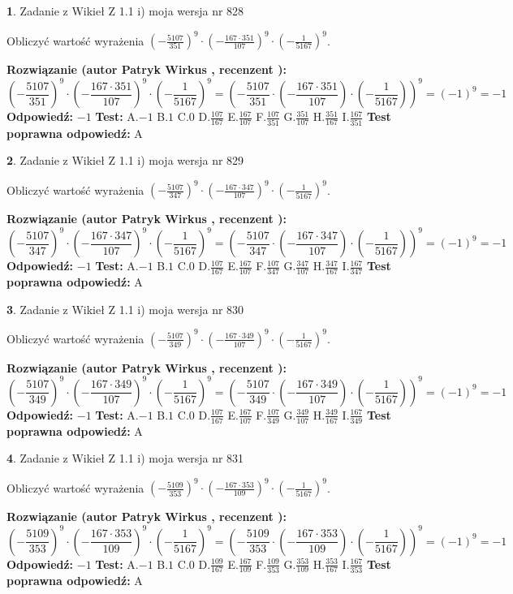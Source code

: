 \documentclass[12pt, a4paper]{article}
\theoremstyle{definition} %
\newtheorem{zad}{}
\newcommand{\zadStart}[1]{\begin{zad}#1\newline}
\newcommand{\zadStop}{\end{zad}}
\newcommand{\rozwStart}[2]{\noindent \textbf{Rozwiązanie (autor #1 , recenzent #2): }\newline}
\newcommand{\rozwStop}{\newline}
\newcommand{\odpStart}{\noindent \textbf{Odpowiedź:}\newline}
\newcommand{\odpStop}{\newline}
\newcommand{\testStart}{\noindent \textbf{Test:}\newline}
\newcommand{\testStop}{\newline}
\newcommand{\kluczStart}{\noindent \textbf{Test poprawna odpowiedź:}\newline}
\newcommand{\kluczStop}{\newline}
\begin{document}
\zadStart{Zadanie z Wikieł Z 1.1 i) moja wersja nr 828}

Obliczyć wartość wyrażenia $(-\frac{5107}{351})^{9} \cdot (-\frac{167 \cdot 351}{107})^{9} \cdot (-\frac{1}{5167})^{9}$.
\zadStop
\rozwStart{Patryk Wirkus}{}
$$(-\frac{5107}{351})^{9} \cdot (-\frac{167 \cdot 351}{107})^{9} \cdot (-\frac{1}{5167})^{9} = (-\frac{5107}{351} \cdot (-\frac{167 \cdot 351}{107}) \cdot (-\frac{1}{5167}))^{9} = (-1)^{9} = -1$$
\rozwStop
\odpStart
$-1$
\odpStop
\testStart
A.$-1$ B.$1$ C.$0$ D.$\frac{107}{167}$ E.$\frac{167}{107}$
F.$\frac{107}{351}$ G.$\frac{351}{107}$
H.$\frac{351}{167}$
I.$\frac{167}{351}$
\testStop
\kluczStart
A
\kluczStop



\zadStart{Zadanie z Wikieł Z 1.1 i) moja wersja nr 829}

Obliczyć wartość wyrażenia $(-\frac{5107}{347})^{9} \cdot (-\frac{167 \cdot 347}{107})^{9} \cdot (-\frac{1}{5167})^{9}$.
\zadStop
\rozwStart{Patryk Wirkus}{}
$$(-\frac{5107}{347})^{9} \cdot (-\frac{167 \cdot 347}{107})^{9} \cdot (-\frac{1}{5167})^{9} = (-\frac{5107}{347} \cdot (-\frac{167 \cdot 347}{107}) \cdot (-\frac{1}{5167}))^{9} = (-1)^{9} = -1$$
\rozwStop
\odpStart
$-1$
\odpStop
\testStart
A.$-1$ B.$1$ C.$0$ D.$\frac{107}{167}$ E.$\frac{167}{107}$
F.$\frac{107}{347}$ G.$\frac{347}{107}$
H.$\frac{347}{167}$
I.$\frac{167}{347}$
\testStop
\kluczStart
A
\kluczStop



\zadStart{Zadanie z Wikieł Z 1.1 i) moja wersja nr 830}

Obliczyć wartość wyrażenia $(-\frac{5107}{349})^{9} \cdot (-\frac{167 \cdot 349}{107})^{9} \cdot (-\frac{1}{5167})^{9}$.
\zadStop
\rozwStart{Patryk Wirkus}{}
$$(-\frac{5107}{349})^{9} \cdot (-\frac{167 \cdot 349}{107})^{9} \cdot (-\frac{1}{5167})^{9} = (-\frac{5107}{349} \cdot (-\frac{167 \cdot 349}{107}) \cdot (-\frac{1}{5167}))^{9} = (-1)^{9} = -1$$
\rozwStop
\odpStart
$-1$
\odpStop
\testStart
A.$-1$ B.$1$ C.$0$ D.$\frac{107}{167}$ E.$\frac{167}{107}$
F.$\frac{107}{349}$ G.$\frac{349}{107}$
H.$\frac{349}{167}$
I.$\frac{167}{349}$
\testStop
\kluczStart
A
\kluczStop



\zadStart{Zadanie z Wikieł Z 1.1 i) moja wersja nr 831}

Obliczyć wartość wyrażenia $(-\frac{5109}{353})^{9} \cdot (-\frac{167 \cdot 353}{109})^{9} \cdot (-\frac{1}{5167})^{9}$.
\zadStop
\rozwStart{Patryk Wirkus}{}
$$(-\frac{5109}{353})^{9} \cdot (-\frac{167 \cdot 353}{109})^{9} \cdot (-\frac{1}{5167})^{9} = (-\frac{5109}{353} \cdot (-\frac{167 \cdot 353}{109}) \cdot (-\frac{1}{5167}))^{9} = (-1)^{9} = -1$$
\rozwStop
\odpStart
$-1$
\odpStop
\testStart
A.$-1$ B.$1$ C.$0$ D.$\frac{109}{167}$ E.$\frac{167}{109}$
F.$\frac{109}{353}$ G.$\frac{353}{109}$
H.$\frac{353}{167}$
I.$\frac{167}{353}$
\testStop
\kluczStart
A
\kluczStop
\end{document}
